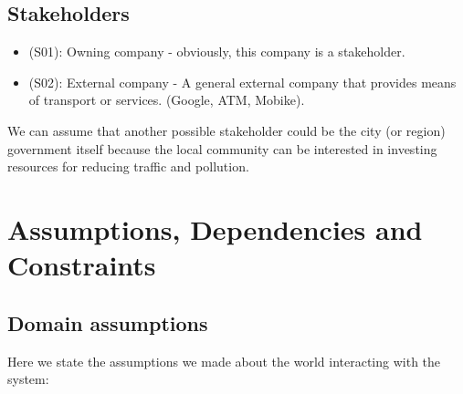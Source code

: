 \documentclass[a4paper,leqno]{book}
\begin{document}
\subsection{Stakeholders}
\begin{itemize}

\item (S01): Owning company - obviously, this company is a stakeholder.
\item (S02): External company - A general external company that provides means of transport or services. (Google, ATM, Mobike).

\end{itemize}

We can assume that another possible stakeholder could be the city (or region) government itself because the local community can be interested in investing resources for reducing traffic and pollution.\\

\section{Assumptions, Dependencies and Constraints}

\subsection{Domain assumptions}
Here we state the assumptions we made about the world interacting with the system:\\
\end{document}
